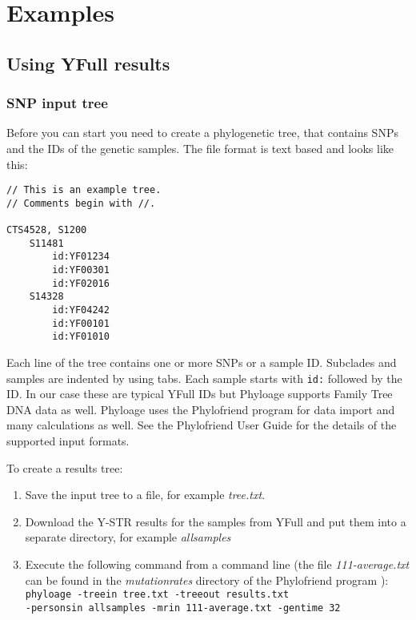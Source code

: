 \section{Examples}

\subsection{Using YFull results}

\subsubsection*{SNP input tree}

Before you can start you need to create a phylogenetic tree,
that contains SNPs and the IDs of the genetic samples. The
file format is text based and looks like this:

\begin{verbatim}
// This is an example tree.
// Comments begin with //.

CTS4528, S1200
    S11481
        id:YF01234
        id:YF00301
        id:YF02016
    S14328
        id:YF04242
        id:YF00101
        id:YF01010
\end{verbatim}

Each line of the tree contains one or more SNPs or a sample
ID. Subclades and samples are indented by using tabs. Each
sample starts with \texttt{id:} followed by the ID. In our case
these are typical YFull IDs but Phyloage supports Family Tree
DNA data as well. Phyloage uses the Phylofriend
\cite{Phylofriend} program for data import and many
calculations as well. See the Phylofriend User Guide
\cite{PhylofriendUserGuide} for the details of the supported
input formats.

To create a results tree:

\begin{enumerate}
\item Save the input tree to a file, for example \emph{tree.txt}.
\item Download the Y-STR results for the samples from YFull
    and put them into a separate directory, for example
    \emph{allsamples}
\item Execute the following command from a command line
    (the file \emph{111-average.txt} can be found in the
    \emph{mutationrates} directory of the Phylofriend program
    \cite{Phylofriend}):\\
\texttt{phyloage -treein tree.txt -treeout results.txt\\
-personsin allsamples -mrin 111-average.txt -gentime 32}
\end{enumerate}

